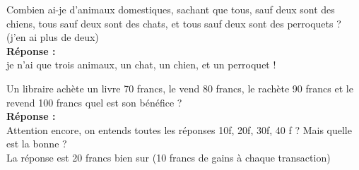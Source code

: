 \documentclass[twocolumn]{article}
\begin{document}
\exo
\par
Combien ai-je d'animaux domestiques, sachant que tous, sauf deux sont des 
chiens, tous sauf deux sont des chats, et tous sauf deux sont des perroquets ? 
(j'en ai plus de deux)\\

\textbf{Réponse :}\\

je n'ai que trois animaux, un chat, un chien, et un perroquet !

\par
\vspace{3mm}

\exo
\par
Un libraire achète un livre 70 francs, le vend 80 francs, le rachète 90 
francs et le revend 100 francs quel est son bénéfice ?\\

\textbf{Réponse :}\\

Attention encore, on entends toutes les réponses 10f, 20f, 30f, 40 f ?
Mais quelle est la bonne ?\\

La réponse est 20 francs bien sur (10 francs de gains à chaque transaction)

\par
\vspace{3mm}
\end{document}
